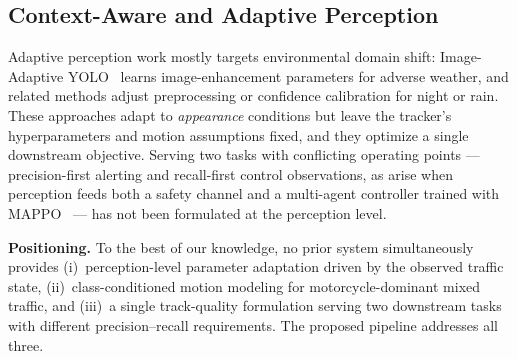 \subsection{Context-Aware and Adaptive Perception}
\label{subsec:rw_adaptive}

Adaptive perception work mostly targets environmental domain shift:
Image-Adaptive YOLO~\cite{Liu2022_iayolo} learns image-enhancement
parameters for adverse weather, and related methods adjust
preprocessing or confidence calibration for night or rain.
These approaches adapt to \emph{appearance} conditions but leave the
tracker's hyperparameters and motion assumptions fixed, and they
optimize a single downstream objective.
Serving two tasks with conflicting operating points --- precision-first
alerting and recall-first control observations, as arise when
perception feeds both a safety channel and a multi-agent controller
trained with MAPPO~\cite{Yu2022_mappo} --- has not been formulated at
the perception level.

\medskip
\noindent\textbf{Positioning.}
To the best of our knowledge, no prior system simultaneously provides
(i)~perception-level parameter adaptation driven by the observed
traffic state, (ii)~class-conditioned motion modeling for
motorcycle-dominant mixed traffic, and (iii)~a single track-quality
formulation serving two downstream tasks with different
precision--recall requirements.
The proposed pipeline addresses all three.
